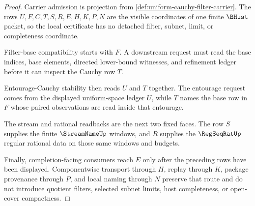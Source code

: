 \begin{proof}
Carrier admission is projection from \autoref{def:uniform-cauchy-filter-carrier}. The rows $U,F,C,T,S,R,E,H,K,P,N$ are the visible coordinates of one finite $\BHist$ packet, so the local certificate has no detached filter, subnet, limit, or completeness coordinate.

Filter-base compatibility starts with $F$. A downstream request must read the base indices, base elements, directed lower-bound witnesses, and refinement ledger before it can inspect the Cauchy row $T$.

Entourage-Cauchy stability then reads $U$ and $T$ together. The entourage request comes from the displayed uniform-space ledger $U$, while $T$ names the base row in $F$ whose paired observations are read inside that entourage.

The stream and rational readbacks are the next two fixed faces. The row $S$ supplies the finite $\StreamNameUp$ windows, and $R$ supplies the $\RegSeqRatUp$ regular rational data on those same windows and budgets.

Finally, completion-facing consumers reach $E$ only after the preceding rows have been displayed. Componentwise transport through $H$, replay through $K$, package provenance through $P$, and local naming through $N$ preserve that route and do not introduce quotient filters, selected subnet limits, host completeness, or open-cover compactness.
\end{proof}


